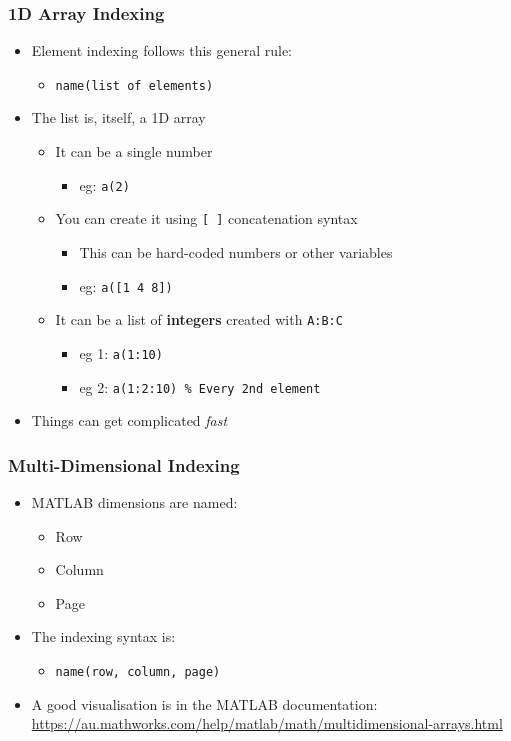 \documentclass[14pt]{beamer}
\begin{document}
\begin{frame}
\frametitle{1D Array Indexing}
\begin{itemize}
\item Element indexing follows this general rule:
	\begin{itemize}
		\item \texttt{name(list of elements)}
	\end{itemize}
\item The list is, itself, a 1D array
	\begin{itemize}
		\item It can be a single number
			\begin{itemize}
				\item eg: \texttt{a(2)}
			\end{itemize}
		\item You can create it using \texttt{[ ]} concatenation syntax
		\begin{itemize}
			\item This can be hard-coded numbers or other variables
			\item eg: \texttt{a([1 4 8])}
		\end{itemize}
		\item It can be a list of \textbf{integers} created with \texttt{A:B:C}
			\begin{itemize}
				\item eg 1: \texttt{a(1:10)}
				\item eg 2: \texttt{a(1:2:10) \% Every 2nd element}
			\end{itemize}
	\end{itemize}
\item Things can get complicated \textit{fast}
\end{itemize}
\end{frame}

\begin{frame}
\frametitle{Multi-Dimensional Indexing}
\begin{itemize}
\item MATLAB dimensions are named:
	\begin{itemize}
		\item Row
		\item Column
		\item Page
	\end{itemize}
\item The indexing syntax is:
	\begin{itemize}
		\item \texttt{name(row, column, page)}
	\end{itemize}
\item A good visualisation is in the MATLAB documentation: \url{https://au.mathworks.com/help/matlab/math/multidimensional-arrays.html}
\end{itemize}
\end{frame}
\end{document}
